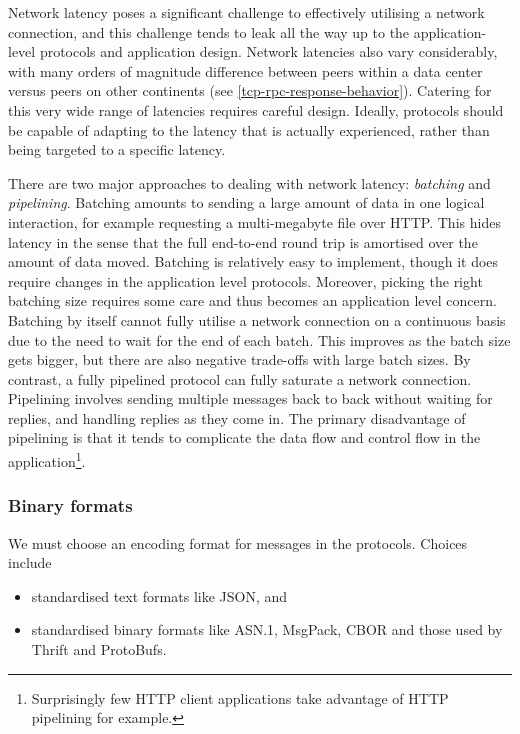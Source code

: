 \documentclass[11pt,a4paper]{article}
\begin{document}
Network latency poses a significant challenge to effectively utilising a
network connection, and this challenge tends to leak all the way up to
the application-level protocols and application design. Network
latencies also vary considerably, with many orders of magnitude
difference between peers within a data center versus peers on other
continents (see \cref{tcp-rpc-response-behavior}). Catering for this very wide range of latencies requires
careful design. Ideally, protocols should be capable of adapting to the
latency that is actually experienced, rather than being targeted to a
specific latency.

There are two major approaches to dealing with network latency:
\emph{batching} and \emph{pipelining}. Batching amounts to sending a
large amount of data in one logical interaction, for example requesting
a multi-megabyte file over HTTP. This hides latency in the sense that
the full end-to-end round trip is amortised over the amount of data
moved. Batching is relatively easy to implement, though it does require
changes in the application level protocols. Moreover, picking the right
batching size requires some care and thus becomes an application level
concern. Batching by itself cannot fully utilise a network connection on
a continuous basis due to the need to wait for the end of each batch.
This improves as the batch size gets bigger, but there are also negative
trade-offs with large batch sizes. By contrast, a fully pipelined
protocol can fully saturate a network connection. Pipelining involves
sending multiple messages back to back without waiting for replies, and
handling replies as they come in. The primary disadvantage of pipelining
is that it tends to complicate the data flow and control flow in the
application\footnote{Surprisingly few HTTP client applications take
  advantage of HTTP pipelining for example.}.

\subsubsection{Binary formats}
\label{binary-formats}

We must choose an encoding format for messages in the protocols. Choices
include

\begin{itemize}
\item
  standardised text formats like JSON, and
\item
  standardised binary formats like ASN.1, MsgPack, CBOR and those used
  by Thrift and ProtoBufs.
\end{itemize}
\end{document}
